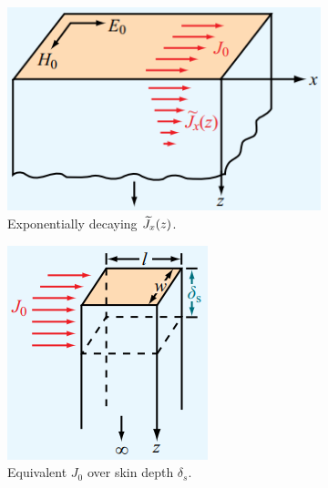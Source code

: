 \begin{figure}[!htp]
    \centering
    \begin{subfigure}{0.48\linewidth}
        \includegraphics[width=\linewidth]{images/Plane Wave Propagation/ExponentiallyDecayingJ.png}
        \caption{Exponentially decaying $\widetilde{J}_x(z)$.}
        \label{subfig:ExponentialDecayJ}
    \end{subfigure}
    \hfill
    \begin{subfigure}{0.48\linewidth}
        \centering
        \includegraphics[width=0.6\linewidth]{images/Plane Wave Propagation/EquivalentJ0.png}
        \caption{Equivalent $J_0$ over skin depth $\delta_s$.}
        \label{subfig:EquivalentJ0}
    \end{subfigure}
    \caption{}
    \label{fig:ExponentialDecayJ}
\end{figure}

